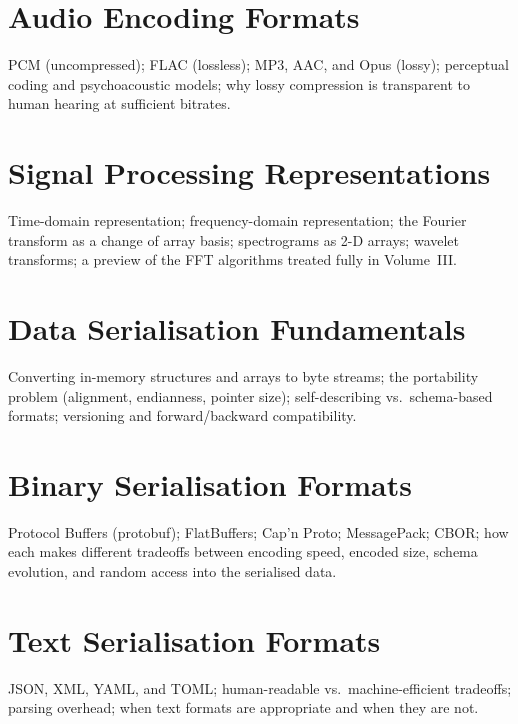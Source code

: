 \chapter{Audio Encoding Formats}
\label{ch:audio-encoding}

PCM (uncompressed); FLAC (lossless); MP3, AAC, and Opus (lossy); perceptual
coding and psychoacoustic models; why lossy compression is transparent to
human hearing at sufficient bitrates.

\chapter{Signal Processing Representations}
\label{ch:signal-processing-repr}

Time-domain representation; frequency-domain representation; the Fourier
transform as a change of array basis; spectrograms as 2-D arrays; wavelet
transforms; a preview of the FFT algorithms treated fully in Volume~III.



\chapter{Data Serialisation Fundamentals}
\label{ch:serialisation-fundamentals}

Converting in-memory structures and arrays to byte streams; the portability
problem (alignment, endianness, pointer size); self-describing vs.\
schema-based formats; versioning and forward/backward compatibility.

\chapter{Binary Serialisation Formats}
\label{ch:binary-serialisation}

Protocol Buffers (protobuf); FlatBuffers; Cap'n Proto; MessagePack; CBOR;
how each makes different tradeoffs between encoding speed, encoded size,
schema evolution, and random access into the serialised data.

\chapter{Text Serialisation Formats}
\label{ch:text-serialisation}

JSON, XML, YAML, and TOML; human-readable vs.\ machine-efficient tradeoffs;
parsing overhead; when text formats are appropriate and when they are not.

